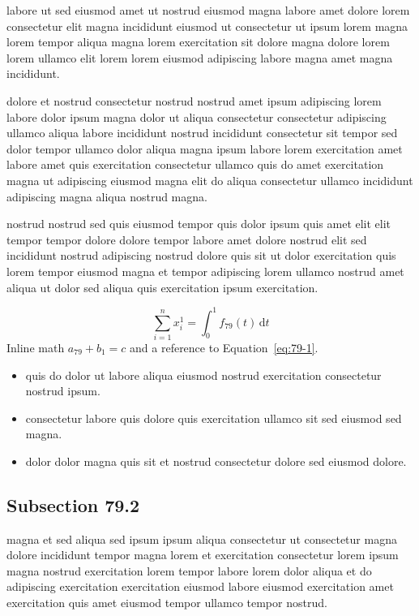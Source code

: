 \documentclass{article}
\begin{document}
labore ut sed eiusmod amet ut nostrud eiusmod magna labore amet dolore lorem consectetur elit magna incididunt eiusmod ut consectetur ut ipsum lorem magna lorem tempor aliqua magna lorem exercitation sit dolore magna dolore lorem lorem ullamco elit lorem lorem eiusmod adipiscing labore magna amet magna incididunt.

dolore et nostrud consectetur nostrud nostrud amet ipsum adipiscing lorem labore dolor ipsum magna dolor ut aliqua consectetur consectetur adipiscing ullamco aliqua labore incididunt nostrud incididunt consectetur sit tempor sed dolor tempor ullamco dolor aliqua magna ipsum labore lorem exercitation amet labore amet quis exercitation consectetur ullamco quis do amet exercitation magna ut adipiscing eiusmod magna elit do aliqua consectetur ullamco incididunt adipiscing magna aliqua nostrud magna.

nostrud nostrud sed quis eiusmod tempor quis dolor ipsum quis amet elit elit tempor tempor dolore dolore tempor labore amet dolore nostrud elit sed incididunt nostrud adipiscing nostrud dolore quis sit ut dolor exercitation quis lorem tempor eiusmod magna et tempor adipiscing lorem ullamco nostrud amet aliqua ut dolor sed aliqua quis exercitation ipsum exercitation.

\begin{equation}\label{eq:79-1}
  \sum_{i=1}^{n} x_i^{1} = \int_0^1 f_{79}(t)\,\mathrm{d}t
\end{equation}
Inline math $a_{79} + b_{1} = c$ and a reference to Equation~\eqref{eq:79-1}.

\begin{itemize}
  \item quis do dolor ut labore aliqua eiusmod nostrud exercitation consectetur nostrud ipsum.
  \item consectetur labore quis dolore quis exercitation ullamco sit sed eiusmod sed magna.
  \item dolor dolor magna quis sit et nostrud consectetur dolore sed eiusmod dolore.
\end{itemize}

\subsection{Subsection 79.2}\label{sec:79-2}
magna et sed aliqua sed ipsum ipsum aliqua consectetur ut consectetur magna dolore incididunt tempor magna lorem et exercitation consectetur lorem ipsum magna nostrud exercitation lorem tempor labore lorem dolor aliqua et do adipiscing exercitation exercitation eiusmod labore eiusmod exercitation amet exercitation quis amet eiusmod tempor ullamco tempor nostrud.
\end{document}
